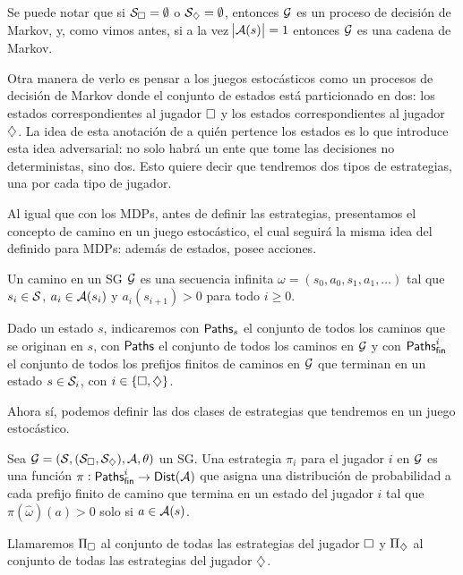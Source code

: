 Se puede notar que si $\mathcal{S}_\square = \emptyset$ o $\mathcal{S}_\diamondsuit = \emptyset$,
entonces $\mathcal{G}$ es un proceso de decisión de Markov, y, como vimos antes, si a la
vez $\abs{\mathcal{A}(s)} = 1$ entonces $\mathcal{G}$ es una cadena de Markov.

Otra manera de verlo es pensar a los juegos estocásticos como un procesos de
decisión de Markov donde el conjunto de estados está particionado en dos: los
estados correspondientes al jugador $\square$ y los estados correspondientes al
jugador $\diamondsuit$. La idea de esta anotación de a quién pertence los estados es
lo que introduce esta idea adversarial: no solo habrá un ente que tome las
decisiones no deterministas, sino dos. Esto quiere decir que tendremos dos
tipos de estrategias, una por cada tipo de jugador.

Al igual que con los MDPs, antes de definir las estrategias, presentamos el
concepto de camino en un juego estocástico, el cual seguirá la misma idea del
definido para MDPs: además de estados, posee acciones.

\begin{definition}[Camino en un SG]
	Un camino en un SG $\mathcal{G}$ es una secuencia infinita $\omega = (s_0, a_0, s_1, a_1, \dots)$ tal que $s_i \in \mathcal{S}$, $a_i \in \mathcal{A}(s_i)$ y $a_i(s_{i+1}) > 0$ para todo $i \geq 0$.

	Dado un estado $s$, indicaremos con $\textsf{Paths}_s$ el conjunto de todos los caminos
	que se originan en $s$, con $\textsf{Paths}$ el conjunto de todos los caminos en $\mathcal{G}$ y
	con $\textsf{Paths}_\textsf{fin}^i$ el conjunto de todos los prefijos finitos de caminos en $\mathcal{G}$
	que terminan en un estado $s \in \mathcal{S}_i$, con $i \in \{\square, \diamondsuit\}$.
\end{definition}

Ahora sí, podemos definir las dos clases de estrategias que tendremos en un
juego estocástico.

\begin{definition}
	Sea $\mathcal{G} = (\mathcal{S}, (\mathcal{S}_\square, \mathcal{S}_\diamondsuit), \mathcal{A}, \theta)$ un SG. Una estrategia $\pi_i$ para el jugador $i$ en $\mathcal{G}$ es una función $\pi: \textsf{Paths}_\textsf{fin}^i \rightarrow \mathsf{Dist} (\mathcal{A})$ que asigna una distribución de probabilidad a cada prefijo finito de camino que termina en un estado del jugador $i$ tal que $\pi(\hat \omega) (a) > 0$ solo si $a \in \mathcal{A}(s)$.

	Llamaremos $\Pi_\square$ al conjunto de todas las estrategias del jugador $\square$
	y $\Pi_\diamondsuit$ al conjunto de todas las estrategias del jugador $\diamondsuit$.
\end{definition}

